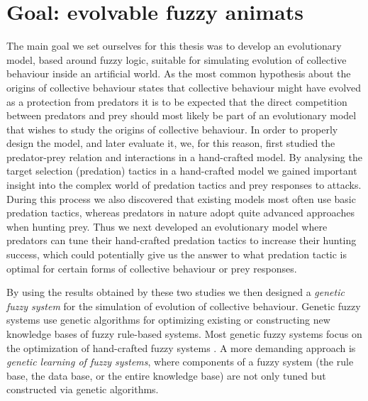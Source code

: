 \section{Goal: evolvable fuzzy animats}

The main goal we set ourselves for this thesis was to develop an evolutionary model, based around fuzzy logic, suitable for simulating evolution of collective behaviour inside an artificial world. As the most common hypothesis about the origins of collective behaviour states that collective behaviour might have evolved as a protection from predators \cite{cresswell2011predicting,hart2005predator,krause2002living,larsson2012why,lebarbajec2009organized,nishimura2002predator,pavlov2000patterns} it is to be expected that the direct competition between predators and prey should most likely be part of an evolutionary model that wishes to study the origins of collective behaviour. In order to properly design the model, and later evaluate it, we, for this reason, first studied the predator-prey relation and interactions in a hand-crafted model. By analysing the target selection (predation) tactics in a hand-crafted model we gained important insight into the complex world of predation tactics and prey responses to attacks. During this process we also discovered that existing models most often use basic predation tactics, whereas predators in nature adopt quite advanced approaches when hunting prey. Thus we next developed an evolutionary model where predators can tune their hand-crafted predation tactics to increase their hunting success, which could potentially give us the answer to what predation tactic is optimal for certain forms of collective behaviour or prey responses.

By using the results obtained by these two studies \cite{demsar2014simulated,demsar2015simulating} we then designed a \emph{genetic fuzzy system} for the simulation of evolution of collective behaviour. Genetic fuzzy systems \cite{cordon2001genetic,cordon2004ten,fernandez2015revisiting,herrera1996genetic,herrera2008genetic,pedrycz1996fuzzy,sanchez1997genetic} use genetic algorithms for optimizing existing or constructing new knowledge bases of fuzzy rule-based systems. Most genetic fuzzy systems focus on the optimization of hand-crafted fuzzy systems \cite{cordon2004ten,fernandez2015revisiting,herrera2008genetic}. A more demanding approach is \emph{genetic learning of fuzzy systems}, where components of a fuzzy system (the rule base, the data base, or the entire knowledge base) are not only tuned but constructed via genetic algorithms.

